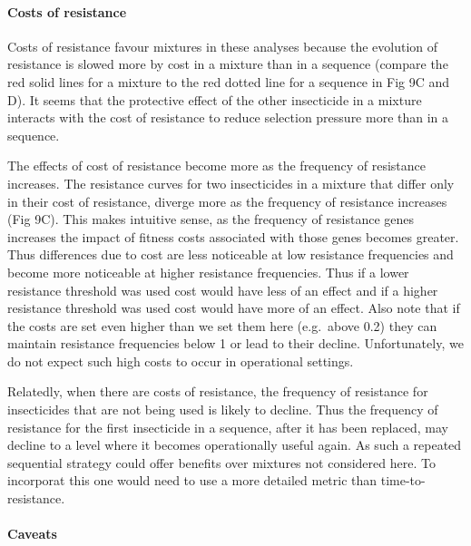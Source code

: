 \documentclass[11pt,]{article}
\let\oldparagraph\paragraph
\renewcommand{\paragraph}[1]{\oldparagraph{#1}\mbox{}}
\begin{document}
\paragraph{Costs of resistance}\label{costs-of-resistance-1}

Costs of resistance favour mixtures in these analyses because the
evolution of resistance is slowed more by cost in a mixture than in a
sequence (compare the red solid lines for a mixture to the red dotted
line for a sequence in Fig 9C and D). It seems that the protective
effect of the other insecticide in a mixture interacts with the cost of
resistance to reduce selection pressure more than in a sequence.

The effects of cost of resistance become more as the frequency of
resistance increases. The resistance curves for two insecticides in a
mixture that differ only in their cost of resistance, diverge more as
the frequency of resistance increases (Fig 9C). This makes intuitive
sense, as the frequency of resistance genes increases the impact of
fitness costs associated with those genes becomes greater. Thus
differences due to cost are less noticeable at low resistance
frequencies and become more noticeable at higher resistance frequencies.
Thus if a lower resistance threshold was used cost would have less of an
effect and if a higher resistance threshold was used cost would have
more of an effect. Also note that if the costs are set even higher than
we set them here (e.g.~above 0.2) they can maintain resistance
frequencies below 1 or lead to their decline. Unfortunately, we do not
expect such high costs to occur in operational settings.

Relatedly, when there are costs of resistance, the frequency of
resistance for insecticides that are not being used is likely to
decline. Thus the frequency of resistance for the first insecticide in a
sequence, after it has been replaced, may decline to a level where it
becomes operationally useful again. As such a repeated sequential
strategy could offer benefits over mixtures not considered here. To
incorporat this one would need to use a more detailed metric than
time-to-resistance.

\paragraph{Caveats}\label{caveats}
\end{document}
